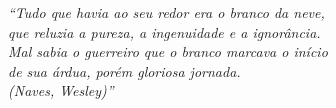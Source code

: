 \begin{epigrafe}
    \vspace*{\fill}
	\begin{flushright}

		\textit{``Tudo que havia ao seu redor era o branco da neve, \\
		que reluzia a pureza, a ingenuidade e a ignorância. \\
		Mal sabia o guerreiro que o branco marcava o início \\
		de sua árdua, porém gloriosa jornada.\\
		(Naves, Wesley)''}
	\end{flushright}
\end{epigrafe}

\begin{comment}
	O primeiro raio \\ 
		de sol brilhou forte e trouxe consigo a certeza da \\
		direção a ser seguida. Para o guerreiro era um sinal \\
		de esperança que lhe dava coragem e a confiança para \\
		seguir adiante. 
\end{comment}
